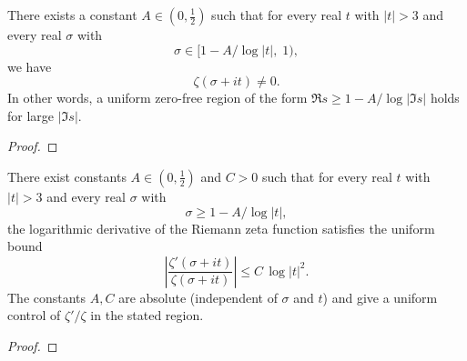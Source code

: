 \begin{lemma} \label{lem:ZetaZeroFree}  \leanok
There exists a constant $A\in(0,\tfrac12)$ such that for every real $t$ with $|t|>3$ and every real $\sigma$ with
$$\sigma \in [1 - A/\log|t|,\; 1),$$
we have
$$\zeta(\sigma + i t) \neq 0.$$
In other words, a uniform zero-free region of the form $\Re s \ge 1 - A/\log|\Im s|$ holds for large $|\Im s|$.
\end{lemma}
\begin{proof}
\leanok
\end{proof}

\begin{lemma} \label{lem:LogDerivZetaBndUnif}  \leanok
There exist constants $A\in(0,\tfrac12)$ and $C>0$ such that for every real $t$ with $|t|>3$ and every real $\sigma$ with
$$\sigma \ge 1 - A/\log|t|,$$
the logarithmic derivative of the Riemann zeta function satisfies the uniform bound
$$\left|\frac{\zeta'(\sigma + i t)}{\zeta(\sigma + i t)}\right| \le C\,\log|t|^2.
$$
The constants $A,C$ are absolute (independent of $\sigma$ and $t$) and give a uniform control of $\zeta'/\zeta$ in the stated region.
\end{lemma}
\begin{proof}
\leanok
{}
\end{proof}
